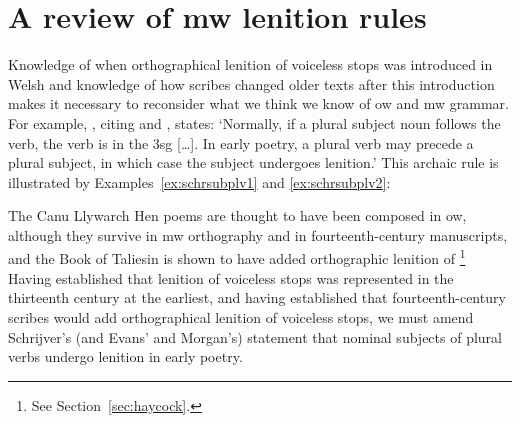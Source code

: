 \section{A review of \gls{mw} lenition rules}
\label{sec:cons-other-ideas}
Knowledge of when orthographical lenition of voiceless stops was introduced in Welsh and knowledge of how scribes changed older texts after this introduction makes it necessary to reconsider what we think we know of \gls{ow} and \gls{mw} grammar. For example, \textcite[2]{schrijver_free_2010}, citing \textcite[18, 179]{evans_grammar_1964} and \textcite[193n]{morgan_y_1952}, states:
`Normally, if a plural subject noun follows the verb, the verb is in the 3sg […]. In early poetry, a plural verb may precede a plural subject, in which case the subject undergoes lenition.' This  archaic rule is illustrated by Examples~\ref{ex:schrsubplv1} and \ref{ex:schrsubplv2}:
\begin{mwl}
\end{mwl}

The Canu Llywarch Hen poems are thought to have been composed in \gls{ow}, although they survive in \gls{mw} orthography and in fourteenth-century manuscripts, and the Book of Taliesin is shown to have added orthographic lenition of \footnote{See Section~\ref{sec:haycock}.} Having established that  lenition of voiceless stops was represented in the thirteenth century at the earliest, and having established that fourteenth-century scribes would add orthographical lenition of voiceless stops, we must amend Schrijver's (and Evans' and Morgan's) statement that nominal subjects of plural verbs undergo lenition in early poetry.

